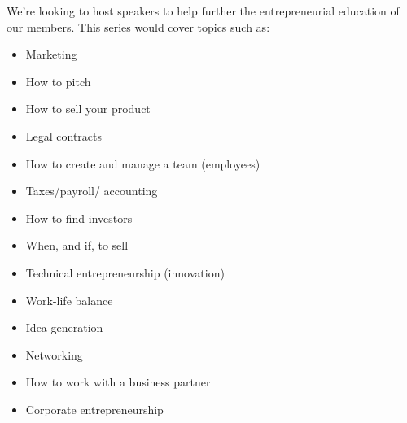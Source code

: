 \begin{minipage}[t]{.66\linewidth}
We’re looking to host speakers to help further the entrepreneurial education of our members. This series would cover topics such as:
\begin{multicols}{2}
\begin{itemize}
    \item Marketing
    \item How to pitch
    \item How to sell your product
    \item Legal contracts
    \item How to create and manage a team (employees)
    \item Taxes/payroll/ accounting 
    \item How to find investors
    \item When, and if, to sell
    \item Technical entrepreneurship (innovation)
    \item Work-life balance 
    \item Idea generation
    \item Networking 
    \item How to work with a business partner
    \item Corporate entrepreneurship
\end{itemize}
\end{multicols}

\end{minipage} %